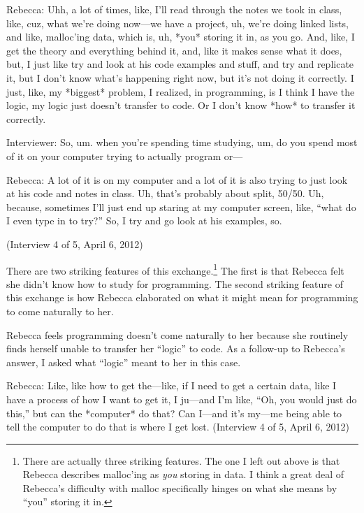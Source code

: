 Rebecca: Uhh, a lot of times, like, I'll read through the notes we took
in class, like, cuz, what we're doing now---we have a project, uh, we're
doing linked lists, and like, malloc'ing data, which is, uh, *you*
storing it in, as you go. And, like, I get the theory and everything
behind it, and, like it makes sense what it does, but, I just like try
and look at his code examples and stuff, and try and replicate it, but I
don't know what's happening right now, but it's not doing it correctly.
I just, like, my *biggest* problem, I realized, in programming, is I
think I have the logic, my logic just doesn't transfer to code. Or I
don't know *how* to transfer it correctly.

Interviewer: So, um. when you're spending time studying, um, do you
spend most of it on your computer trying to actually program or---

Rebecca: A lot of it is on my computer and a lot of it is also trying to
just look at his code and notes in class. Uh, that's probably about
split, 50/50. Uh, because, sometimes I'll just end up staring at my
computer screen, like, ``what do I even type in to try?'' So, I try and
go look at his examples, so.

(Interview 4 of 5, April 6, 2012)

There are two striking features of this exchange.\footnote{There are
  actually three striking features. The one I left out above is that
  Rebecca describes malloc'ing as \emph{you} storing in data. I think a
  great deal of Rebecca's difficulty with malloc specifically hinges on
  what she means by ``you'' storing it in.} The first is that Rebecca
felt she didn't know how to study for programming. The second striking
feature of this exchange is how Rebecca elaborated on what it might mean
for programming to come naturally to her.

Rebecca feels programming doesn't come naturally to her because she
routinely finds herself unable to transfer her ``logic'' to code. As a
follow-up to Rebecca's answer, I asked what ``logic'' meant to her in
this case.

Rebecca: Like, like how to get the---like, if I need to get a certain
data, like I have a process of how I want to get it, I ju---and I'm
like, ``Oh, you would just do this,'' but can the *computer* do that?
Can I---and it's my---me being able to tell the computer to do that is
where I get lost. (Interview 4 of 5, April 6, 2012)

